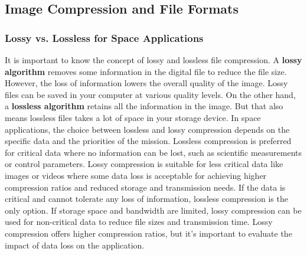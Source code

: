\documentclass[10pt]{article}
\begin{document}
\begin{multicols}{2}
\subsection{Image Compression and File Formats}

\subsubsection{Lossy vs. Lossless for Space Applications}
It is important to know the concept of lossy and lossless file compression. A \textbf{lossy algorithm} removes some information in the digital file to reduce the file size. However, the loss of information lowers the overall quality of the image. Lossy files can be saved in your computer at various quality levels.
On the other hand, a \textbf{lossless algorithm} retains all the information in the image. But that also means lossless files takes a lot of space in your storage device.
\newline \newline
In space applications, the choice between lossless and lossy compression depends on the specific data and the priorities of the mission.
Lossless compression is preferred for critical data where no information can be lost, such as scientific measurements or control parameters. Lossy compression is suitable for less critical data like images or videos where some data loss is acceptable for achieving higher compression ratios and reduced storage and transmission needs.
\newline \newline
If the data is critical and cannot tolerate any loss of information, lossless compression is the only option.
If storage space and bandwidth are limited, lossy compression can be used for non-critical data to reduce file sizes and transmission time. Lossy compression offers higher compression ratios, but it's important to evaluate the impact of data loss on the application.


\end{multicols}
\end{document}
